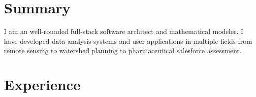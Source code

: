 \documentclass[letterpaper]{twentysecondcv} %
\begin{document}
\makeprofile %

\section{Summary}
I am an well-rounded full-stack software architect and mathematical modeler. I have developed data analysis systems and user applications in multiple fields from \mbox{remote} sensing to watershed planning to pharmaceutical salesforce assessment.


\section{Experience}
\end{document}
